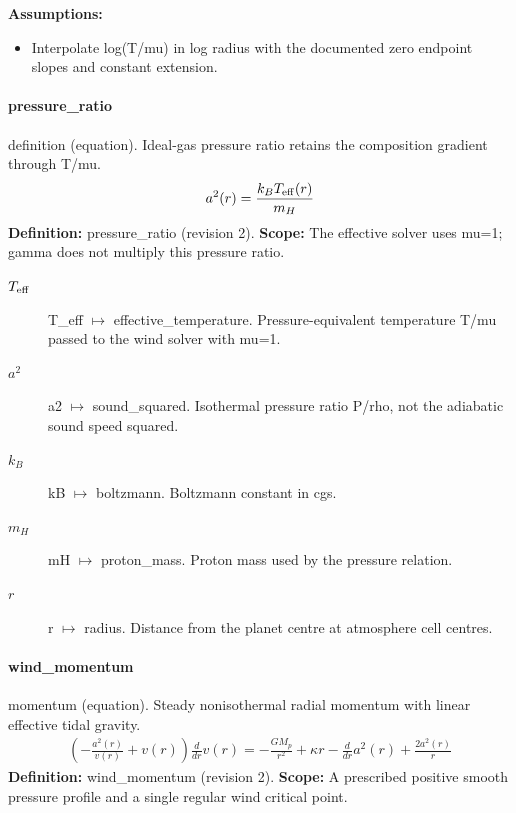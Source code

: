 \noindent\textbf{Assumptions:}
\begin{itemize}
\item Interpolate log(T/mu) in log radius with the documented zero endpoint slopes and constant extension.
\end{itemize}

\paragraph{pressure\_ratio}
definition (equation). Ideal-gas pressure ratio retains the composition gradient through T/mu.
\begin{equation}
\begin{aligned}
a^2{\left(r \right)} = \frac{k_B T_{\rm eff}{\left(r \right)}}{m_H}
\end{aligned}
\label{eq:escape.mathematical_5f_model_3a_composition_5f_wind:pressure_5f_ratio:2}
\end{equation}
\noindent\textbf{Definition:} pressure\_ratio (revision 2).
\textbf{Scope:} The effective solver uses mu=1; gamma does not multiply this pressure ratio.

\begin{description}
\item[$T_{\rm eff}$] T\_eff $\mapsto$ effective\_temperature. Pressure-equivalent temperature T/mu passed to the wind solver with mu=1.
\item[$a^2$] a2 $\mapsto$ sound\_squared. Isothermal pressure ratio P/rho, not the adiabatic sound speed squared.
\item[$k_B$] kB $\mapsto$ boltzmann. Boltzmann constant in cgs.
\item[$m_H$] mH $\mapsto$ proton\_mass. Proton mass used by the pressure relation.
\item[$r$] r $\mapsto$ radius. Distance from the planet centre at atmosphere cell centres.
\end{description}

\paragraph{wind\_momentum}
momentum (equation). Steady nonisothermal radial momentum with linear effective tidal gravity.
\begin{equation}
\begin{aligned}
\left(- \frac{a^2{\left(r \right)}}{v{\left(r \right)}} + v{\left(r \right)}\right) \frac{d}{d r} v{\left(r \right)} = - \frac{GM_p}{r^{2}} + \kappa r - \frac{d}{d r} a^2{\left(r \right)} + \frac{2 a^2{\left(r \right)}}{r}
\end{aligned}
\label{eq:escape.mathematical_5f_model_3a_composition_5f_wind:wind_5f_momentum:2}
\end{equation}
\noindent\textbf{Definition:} wind\_momentum (revision 2).
\textbf{Scope:} A prescribed positive smooth pressure profile and a single regular wind critical point.

